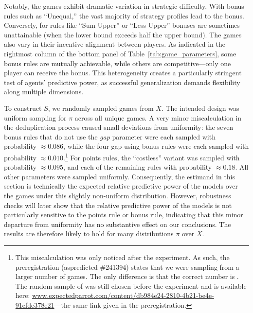 Notably, the games exhibit dramatic variation in strategic difficulty. 
With bonus rules such as ``Unequal,'' the vast majority of strategy profiles lead to the bonus.
Conversely, for rules like ``Sum Upper'' or ``Less Upper'' bonuses are sometimes unattainable (when the lower bound exceeds half the upper bound). 
The games also vary in their incentive alignment between players.
As indicated in the rightmost column of the bottom panel of Table~\ref{tab:game_parameters}, some bonus rules are mutually achievable, while others are competitive---only one player can receive the bonus.
This heterogeneity creates a particularly stringent test of agents' predictive power, as successful generalization demands flexibility along multiple dimensions.

To construct $S$, we randomly sampled \NGamesS{} games from $X$. 
The intended design was uniform sampling for $\pi$ across all \TotalGames{} unique games. 
A very minor miscalculation in the deduplication process caused small deviations from uniformity: the seven bonus rules that do not use the \textit{gap} parameter were each sampled with probability $\approx 0.086$, while the four gap-using bonus rules were each sampled with probability $\approx 0.010$.\footnote{This miscalculation was only noticed after the experiment. As such, the preregistration (aspredicted \#241394) states that we were sampling from a larger number of games. 
The only difference is that the correct number is \TotalGames{}. The random sample of \NGamesS{} was still chosen before the experiment and is available here: \url{www.expectedparrot.com/content/db984e24-2810-4b21-be4e-91efde378e21}---the same link given in the preregistration.}
For points rules, the ``costless'' variant was sampled with probability $\approx 0.095$, and each of the remaining rules with probability $\approx 0.18$. 
All other parameters were sampled uniformly. 
Consequently, the estimand in this section is technically the expected relative predictive power of the models over the \TotalGames{} games under this slightly non-uniform distribution.
However, robustness checks will later show that the relative predictive power of the models is not particularly sensitive to the points rule or bonus rule, indicating that this minor departure from uniformity has no substantive effect on our conclusions.
The results are therefore likely to hold for many distributions $\pi$ over $X$.
